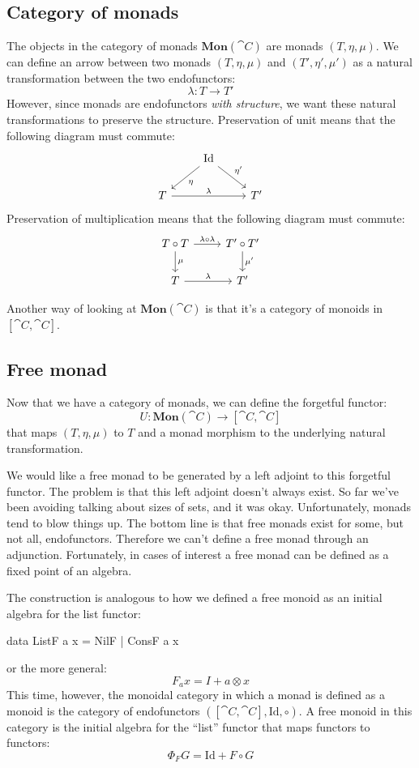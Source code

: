 \documentclass[DaoFP]{subfiles}
\begin{document}
\subsection{Category of monads}

The objects in the category of monads $\mathbf{Mon}(\cat C)$ are monads $(T, \eta, \mu)$. We can define an arrow between two monads $(T, \eta, \mu)$ and $(T', \eta', \mu')$ as a natural transformation between the two endofunctors:
\[ \lambda \colon T \to T' \]
However, since monads are endofunctors \emph{with structure}, we want these natural transformations to preserve the structure. Preservation of unit means that the following diagram must commute:
\[
 \begin{tikzcd}
&\text{Id}
 \arrow[ld, "\eta"]
 \arrow[rd, "\eta'"]
 \\
 T
 \arrow[rr, "\lambda"]
 && T'
 \end{tikzcd}
\]
Preservation of multiplication means that the following diagram must commute:
\[
 \begin{tikzcd}
 T \circ T
 \arrow[r, "\lambda \circ \lambda"]
 \arrow[d, "\mu"]
 & T' \circ T'
 \arrow[d, "\mu'"]
 \\
 T
 \arrow[r, "\lambda"]
 & T'
 \end{tikzcd}
\]

Another way of looking at $\mathbf{Mon}(\cat C)$ is that it's a category of monoids in $[\cat C, \cat C]$. 

\subsection{Free monad}

Now that we have a category of monads, we can define the forgetful functor:
\[ U \colon \mathbf{Mon}(\cat C) \to [\cat C, \cat C] \]
that maps $(T, \eta, \mu)$ to $T$ and a monad morphism to the underlying natural transformation.

We would like a free monad to be generated by a left adjoint to this forgetful functor. The problem is that this left adjoint doesn't always exist. So far we've been avoiding talking about sizes of sets, and it was okay. Unfortunately, monads tend to blow things up. The bottom line is that free monads exist for some, but not all, endofunctors. Therefore we can't define a free monad through an adjunction. Fortunately, in cases of interest a free monad can be defined as a fixed point of an algebra. 

The construction is analogous to how we defined a free monoid as an initial algebra for the list functor:
\begin{haskell}
data ListF a x = NilF | ConsF a x
\end{haskell}
or the more general:
\[ F_a x = I + a \otimes x \]
This time, however, the monoidal category in which a monad is defined as a monoid is the category of endofunctors $([\cat C, \cat C], \text{Id}, \circ)$. A free monoid in this category is the initial algebra for the ``list'' functor that maps functors to functors:
\[ \Phi_F G = \text{Id} + F \circ G \]
\end{document}
